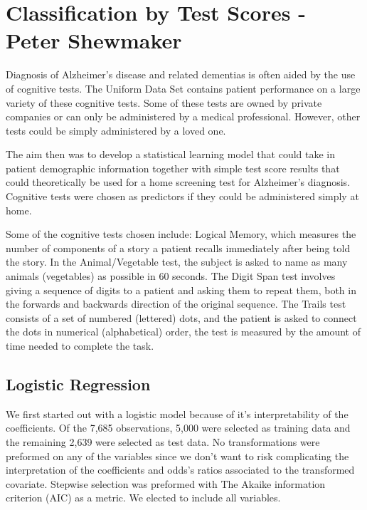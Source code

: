 \documentclass[a4paper,man,natbib,11pt]{article}
\begin{document}
\section{Classification by Test Scores - Peter Shewmaker}

Diagnosis of Alzheimer's disease and related dementias is often aided by the use of cognitive tests. The Uniform Data Set contains patient performance on a large variety of these cognitive tests. Some of these tests are owned by private companies or can only be administered by a medical professional. However, other tests could be simply administered by a loved one. 

The aim then was to develop a statistical learning model that could take in patient demographic information together with simple test score results that could theoretically be used for a home screening test for Alzheimer's diagnosis. Cognitive tests were chosen as predictors if they could be administered simply at home. 

Some of the cognitive tests chosen include: Logical Memory, which measures the number of components of a story a patient recalls immediately after being told the story. In the Animal/Vegetable test, the subject is asked to name as many animals (vegetables) as possible in 60 seconds. The Digit Span test involves giving a sequence of digits to a patient and asking them to repeat them, both in the forwards and backwards direction of the original sequence. The Trails test consists of a set of numbered (lettered) dots, and the patient is asked to connect the dots in numerical (alphabetical) order, the test is measured by the amount of time needed to complete the task.

\subsection{Logistic Regression}
We first started out with a logistic model because of it's interpretability of the coefficients. Of the 7,685 observations, 5,000 were selected as training data and the remaining 2,639 were selected as test data. No transformations were preformed on any of the variables since we don't want to risk complicating the interpretation of the coefficients and odds's ratios associated to the transformed covariate. Stepwise selection was preformed with The Akaike information criterion (AIC) as a metric. We elected to include all variables. 
\end{document}

